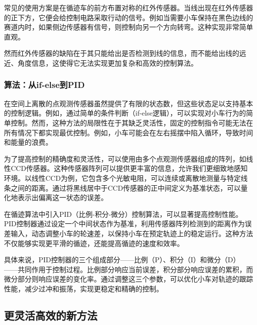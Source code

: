 \documentclass{report}
\begin{document}
常见的使用方案是在循迹车的前方布置对称的红外传感器。当线出现在红外传感器的正下方，它便会给控制电路采取行动的信号。例如当需要小车保持在黑色边线的赛道内时，如果侧边传感器有信号，则控制向另一个方向转弯。这种实现非常简单直观。

然而红外传感器的缺陷在于其只能给出是否检测到线的信息，而不能给出线的远近、角度信息，这使得它无法实现更加复杂和高效的控制算法。

\subsubsection{算法：从if-else到PID}
\label{subsec:label}
在空间上离散的点观测传感器虽然提供了有限的状态数，但这些状态足以支持基本的控制逻辑。例如，通过简单的条件判断（if-else逻辑），可以实现对小车行为的简单控制。然而，这种方法的局限性在于其缺乏灵活性，固定的控制指令可能无法在所有情况下都实现最优控制。例如，小车可能会在左右摇摆中陷入循环，导致时间和能量的浪费。

为了提高控制的精确度和灵活性，可以使用由多个点观测传感器组成的阵列，如线性CCD传感器。这种传感器阵列可以提供更丰富的信息，允许我们更细致地感知环境。以线性CCD为例，它包含多个光敏电阻，可以连续或离散地测量与特定线条之间的距离。通过将黑线居中于CCD传感器的正中间定义为基准状态，可以量化地表示出偏离这一状态的误差\cite{CCD}。

在循迹算法中引入PID（比例-积分-微分）控制算法，可以显著提高控制性能。PID控制器通过设定一个中间状态作为基准，利用传感器阵列检测到的距离作为误差输入，动态调整小车的轮速差，以保持小车在预定轨迹上的稳定运行。这种方法不仅能够实现更平滑的循迹，还能提高循迹的速度和效率。

具体来说，PID控制器的三个组成部分——比例（P）、积分（I）和微分（D）——共同作用于控制过程。比例部分响应当前误差，积分部分响应误差的累积，而微分部分则响应误差的变化率。通过调整这三个参数，可以优化小车对轨迹的跟踪性能，减少过冲和振荡，实现更稳定和精确的控制。


\subsection{更灵活高效的新方法}
\label{subsec:label}
\end{document}
